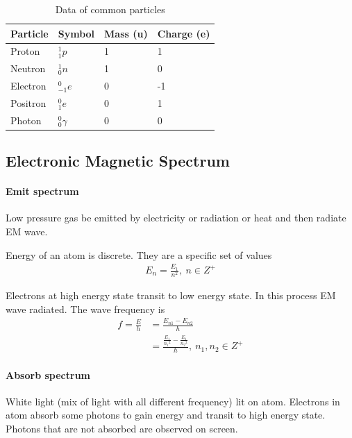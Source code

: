             \begin{table}[H]
                \begin{center}
                    \begin{tabular}{llll}
                        \hline
                        Particle & Symbol & Mass (u) & Charge (e) \\ \hline
                        Proton & $_1^1 p$ & 1 & 1 \\
                        Neutron & $_0^1 n$ & 1 & 0 \\
                        Electron & $_{-1}^0 e$ & 0 & -1 \\
                        Positron & $_1^0 e$ & 0 & 1 \\
                        Photon & $_0^0 \gamma$ & 0 & 0 \\
                    \end{tabular}
                \end{center}
                \caption{Data of common particles}
                \label{com_part_data}
            \end{table}

    \subsection{Electronic Magnetic Spectrum}
        \paragraph{Emit spectrum}
            Low pressure gas be emitted by electricity or radiation or heat and then radiate EM wave.

            Energy of an atom is discrete. They are a specific set of values
            \begin{align}
                E_n = \frac{E_1}{n^2},\  n \in Z^+
            \end{align}

            Electrons at high energy state transit to low energy state. In this process EM wave radiated. The wave frequency is
            \begin{align}
                f = \frac{E}{h} &= \frac{E_{n1} - E_{n2}}{h} \\
                                &= \frac{\frac{E_1}{{n_1}^2} - \frac{E_1}{{n_2}^2}}{h}, \ n_1, n_2 \in Z^+
            \end{align}

        \paragraph{Absorb spectrum}
            White light (mix of light with all different frequency) lit on atom. Electrons in atom absorb some photons to gain energy and transit to high energy state. Photons that are not absorbed are observed on screen. 

